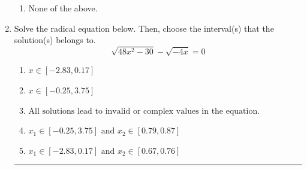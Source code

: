 \documentclass[14pt]{extbook}
\newcommand{\litem}[1]{\item#1\hspace*{-1cm}\rule{\textwidth}{0.4pt}}
\begin{document}
\begin{enumerate}
{\begin{enumerate}[label=\Alph*.]
\item None of the above.
\end{enumerate} }
\litem{
Solve the radical equation below. Then, choose the interval(s) that the solution(s) belongs to.\[ \sqrt{48 x^2 - 30} - \sqrt{-4 x} = 0 \]\begin{enumerate}[label=\Alph*.]
\item \( x \in [-2.83,0.17] \)
\item \( x \in [-0.25,3.75] \)
\item \( \text{All solutions lead to invalid or complex values in the equation.} \)
\item \( x_1 \in [-0.25, 3.75] \text{ and } x_2 \in [0.79,0.87] \)
\item \( x_1 \in [-2.83, 0.17] \text{ and } x_2 \in [0.67,0.76] \)


\end{enumerate}}
\end{enumerate}
\end{document}
